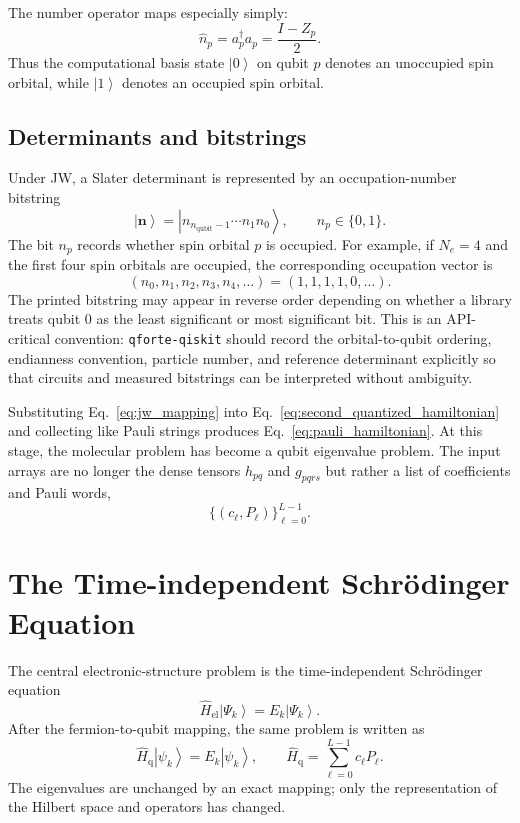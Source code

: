 \documentclass[11pt]{article}
\newcommand{\ket}[1]{\left|#1\right\rangle}
\begin{document}
The number operator maps especially simply:
\begin{equation}
    \hat{n}_p=a_p^\dagger a_p = \frac{I-Z_p}{2}.
\end{equation}
Thus the computational basis state \(\ket{0}\) on qubit $p$ denotes an unoccupied spin orbital, while \(\ket{1}\) denotes an occupied spin orbital.

\subsection{Determinants and bitstrings}

Under JW, a Slater determinant is represented by an occupation-number bitstring
\begin{equation}
    \ket{\mathbf{n}}=\ket{n_{n_{\mathrm{qubit}}-1}\cdots n_1 n_0},
    \qquad n_p\in\{0,1\}.
\end{equation}
The bit $n_p$ records whether spin orbital $p$ is occupied.  For example, if $N_e=4$ and the first four spin orbitals are occupied, the corresponding occupation vector is
\begin{equation}
    (n_0,n_1,n_2,n_3,n_4,\ldots)=(1,1,1,1,0,\ldots).
\end{equation}
The printed bitstring may appear in reverse order depending on whether a library treats qubit $0$ as the least significant or most significant bit.  This is an API-critical convention: \texttt{qforte-qiskit} should record the orbital-to-qubit ordering, endianness convention, particle number, and reference determinant explicitly so that circuits and measured bitstrings can be interpreted without ambiguity.

Substituting Eq.~\eqref{eq:jw_mapping} into Eq.~\eqref{eq:second_quantized_hamiltonian} and collecting like Pauli strings produces Eq.~\eqref{eq:pauli_hamiltonian}.  At this stage, the molecular problem has become a qubit eigenvalue problem.  The input arrays are no longer the dense tensors $h_{pq}$ and $g_{pqrs}$ but rather a list of coefficients and Pauli words,
\begin{equation}
    \{(c_\ell,P_\ell)\}_{\ell=0}^{L-1}.
\end{equation}

\section{The Time-independent Schr\"odinger Equation}

The central electronic-structure problem is the time-independent Schr\"odinger equation
\begin{equation}
    \hat{H}_{\mathrm{el}}\ket{\Psi_k}=E_k\ket{\Psi_k}.
\end{equation}
After the fermion-to-qubit mapping, the same problem is written as
\begin{equation}
    \hat{H}_{\mathrm{q}}\ket{\psi_k}=E_k\ket{\psi_k},
    \qquad
    \hat{H}_{\mathrm{q}}=\sum_{\ell=0}^{L-1}c_\ell P_\ell.
\end{equation}
The eigenvalues are unchanged by an exact mapping; only the representation of the Hilbert space and operators has changed.
\end{document}
